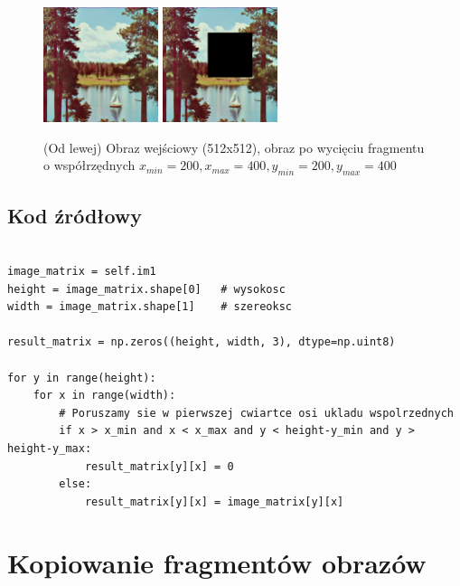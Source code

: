 \documentclass[final,a4paper,openany,12pt]{mwbk}
\begin{document}
\begin{figure}[H]
	\begin{center}
		\includegraphics[width=0.3\textwidth]{2/2Geo_Cut_Original}
		\includegraphics[width=0.3\textwidth]{2/2Geo_Cut_Result}
	\end{center}
	\caption{(Od lewej) Obraz wejściowy (512x512), obraz po wycięciu fragmentu o współrzędnych $x_{min}=200, x_{max}=400, y_{min}=200, y_{max}=400$ }
\end{figure}


\subsection*{Kod źródłowy}


\begin{lstlisting}[caption= Wycinanie fragmentów obrazu]

image_matrix = self.im1
height = image_matrix.shape[0]   # wysokosc
width = image_matrix.shape[1]    # szereoksc

result_matrix = np.zeros((height, width, 3), dtype=np.uint8)

for y in range(height):
    for x in range(width): 
        # Poruszamy sie w pierwszej cwiartce osi ukladu wspolrzednych
        if x > x_min and x < x_max and y < height-y_min and y > height-y_max:
            result_matrix[y][x] = 0
        else:
            result_matrix[y][x] = image_matrix[y][x]

\end{lstlisting}

\section{ Kopiowanie fragmentów obrazów}
\hfill\\
\indent
\end{document}
